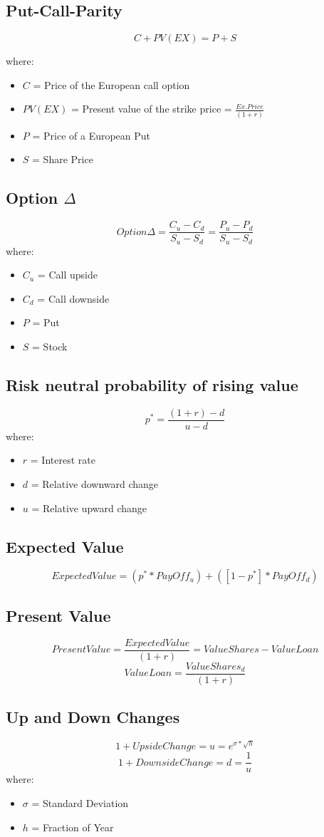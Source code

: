 \documentclass{cheatsheet}
\begin{document}
\subsection{Put-Call-Parity}
    \[
C + PV(EX) = P + S
\]

\noindent where:
\begin{itemize}
  \item $C$ = Price of the European call option
  \item $PV(EX)$ = Present value of the strike price = $\frac{Ex.Price}{(1+r)}$
  \item $P$ = Price of a European Put
  \item $S$ = Share Price
\end{itemize}
\subsection{Option $\Delta$}
\[Option \Delta = \frac{C_u - C_d}{S_u - S_d} = \frac{P_u - P_d}{S_u - S_d}\]
\noindent where:
\begin{itemize}
  \item $C_u$ = Call upside
  \item $C_d$ = Call downside
  \item $P$ = Put
  \item $S$ = Stock
\end{itemize}
\subsection{Risk neutral probability of rising value}
\[p^{*} = \frac{(1+r) - d}{u-d}\]
\noindent where:
\begin{itemize}
  \item $r$ = Interest rate
  \item $d$ = Relative downward change
  \item $u$ = Relative upward change
\end{itemize}
\subsection{Expected Value}
\[Expected Value = (p^{*} * PayOff_u) + ([1 - p^{*}] * PayOff_d)\]
\subsection{Present Value}
\[Present Value = \frac{Expected Value}{(1+r)} = ValueShares - ValueLoan\]
\[Value Loan = \frac{ValueShares_d}{(1+r)}\]
\subsection{Up and Down Changes}
\[1 + UpsideChange = u = e^{\sigma*\sqrt{h}}\]
\[1 + DownsideChange = d = \frac{1}{u}\]
\noindent where:
\begin{itemize}
  \item $\sigma$ = Standard Deviation
  \item $h$ = Fraction of Year
\end{itemize}
\end{document}

